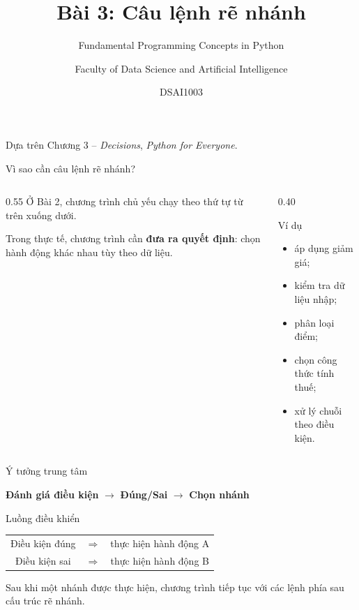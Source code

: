 \documentclass[aspectratio=169,11pt]{beamer}
\title[Bài 3: Câu lệnh rẽ nhánh]{Bài 3: Câu lệnh rẽ nhánh}
\subtitle{Fundamental Programming Concepts in Python}
\author{Faculty of Data Science and Artificial Intelligence}
\institute{National Economics University}
\date{DSAI1003}
\newcommand{\key}[1]{\textbf{\textcolor{neublue}{#1}}}
\newcommand{\smallgap}{\vspace{0.4em}}
\begin{document}
\begin{frame}
  \titlepage
  \vspace{-1em}
  \begin{center}
    \small Dựa trên Chương 3 -- \textit{Decisions}, \textit{Python for Everyone}.
  \end{center}
\end{frame}

\begin{frame}{Vì sao cần câu lệnh rẽ nhánh?}
\begin{columns}[T]
\begin{column}{0.55\textwidth}
Ở Bài 2, chương trình chủ yếu chạy theo thứ tự từ trên xuống dưới.\smallgap

Trong thực tế, chương trình cần \key{đưa ra quyết định}: chọn hành động khác nhau tùy theo dữ liệu.
\end{column}
\begin{column}{0.40\textwidth}
\begin{exampleblock}{Ví dụ}
\begin{itemize}
  \item áp dụng giảm giá;
  \item kiểm tra dữ liệu nhập;
  \item phân loại điểm;
  \item chọn công thức tính thuế;
  \item xử lý chuỗi theo điều kiện.
\end{itemize}
\end{exampleblock}
\end{column}
\end{columns}
\end{frame}

\begin{frame}{Ý tưởng trung tâm}
\begin{center}
\Large
\key{Đánh giá điều kiện} $\rightarrow$ \key{Đúng/Sai} $\rightarrow$ \key{Chọn nhánh}
\end{center}
\vspace{1em}
\begin{block}{Luồng điều khiển}
\centering
\begin{tabular}{c c c}
Điều kiện đúng & $\Rightarrow$ & thực hiện hành động A \\
Điều kiện sai & $\Rightarrow$ & thực hiện hành động B
\end{tabular}
\end{block}
\vspace{1em}
Sau khi một nhánh được thực hiện, chương trình tiếp tục với các lệnh phía sau cấu trúc rẽ nhánh.
\end{frame}
\end{document}
